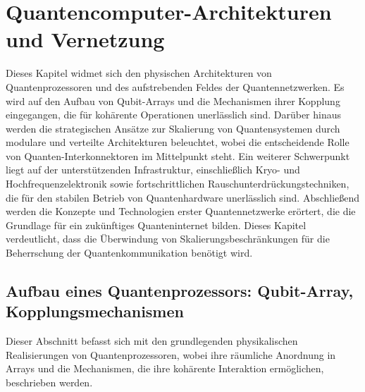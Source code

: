 \section{Quantencomputer-Architekturen und Vernetzung}
Dieses Kapitel widmet sich den physischen Architekturen von Quantenprozessoren und des aufstrebenden Feldes der Quantennetzwerken. Es wird auf den Aufbau von Qubit-Arrays und die Mechanismen ihrer Kopplung eingegangen, die für kohärente Operationen unerlässlich sind. Darüber hinaus werden die strategischen Ansätze zur Skalierung von Quantensystemen durch modulare und verteilte Architekturen beleuchtet, wobei die entscheidende Rolle von Quanten-Interkonnektoren im Mittelpunkt steht. Ein weiterer Schwerpunkt liegt auf der unterstützenden Infrastruktur, einschließlich Kryo- und Hochfrequenzelektronik sowie fortschrittlichen Rauschunterdrückungstechniken, die für den stabilen Betrieb von Quantenhardware unerlässlich sind. Abschließend werden die Konzepte und Technologien erster Quantennetzwerke erörtert, die die Grundlage für ein zukünftiges Quanteninternet bilden. Dieses Kapitel verdeutlicht, dass die Überwindung von Skalierungsbeschränkungen für die Beherrschung der Quantenkommunikation benötigt wird.
\subsection{Aufbau eines Quantenprozessors: Qubit-Array, Kopplungsmechanismen}
Dieser Abschnitt befasst sich mit den grundlegenden physikalischen Realisierungen von Quantenprozessoren, wobei ihre räumliche Anordnung in Arrays und die  Mechanismen, die ihre kohärente Interaktion ermöglichen, beschrieben werden.
